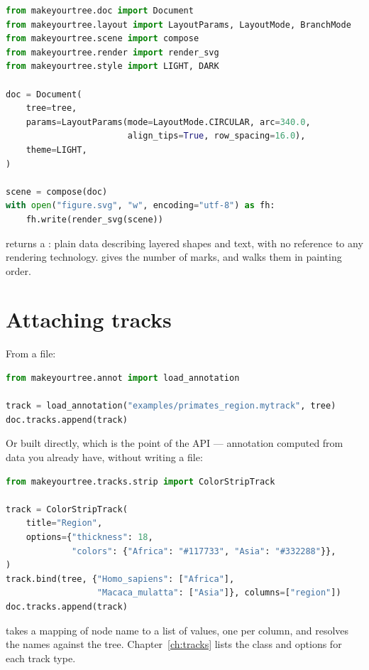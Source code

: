 \begin{lstlisting}[language=Python]
from makeyourtree.doc import Document
from makeyourtree.layout import LayoutParams, LayoutMode, BranchMode
from makeyourtree.scene import compose
from makeyourtree.render import render_svg
from makeyourtree.style import LIGHT, DARK

doc = Document(
    tree=tree,
    params=LayoutParams(mode=LayoutMode.CIRCULAR, arc=340.0,
                        align_tips=True, row_spacing=16.0),
    theme=LIGHT,
)

scene = compose(doc)
with open("figure.svg", "w", encoding="utf-8") as fh:
    fh.write(render_svg(scene))
\end{lstlisting}

 returns a : plain data describing layered shapes and
text, with no reference to any rendering technology.  gives
the number of marks, and  walks them in painting order.

\section{Attaching tracks}

From a file:

\begin{lstlisting}[language=Python]
from makeyourtree.annot import load_annotation

track = load_annotation("examples/primates_region.mytrack", tree)
doc.tracks.append(track)
\end{lstlisting}

Or built directly, which is the point of the API --- annotation computed from
data you already have, without writing a file:

\begin{lstlisting}[language=Python]
from makeyourtree.tracks.strip import ColorStripTrack

track = ColorStripTrack(
    title="Region",
    options={"thickness": 18,
             "colors": {"Africa": "#117733", "Asia": "#332288"}},
)
track.bind(tree, {"Homo_sapiens": ["Africa"],
                  "Macaca_mulatta": ["Asia"]}, columns=["region"])
doc.tracks.append(track)
\end{lstlisting}

 takes a mapping of node name to a list of values, one per column, and
resolves the names against the tree. Chapter~\ref{ch:tracks} lists the class and
options for each track type.

